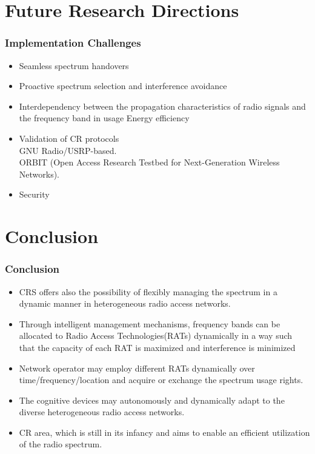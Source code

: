 \documentclass{beamer}
\begin{document}
\section{Future Research Directions}
\begin{frame}
\frametitle{Implementation Challenges}
\begin{itemize}
\item Seamless spectrum handovers
\item Proactive spectrum selection and interference avoidance
\item Interdependency between the propagation characteristics of radio signals and the frequency band in usage Energy efficiency
\item Validation of CR protocols\\
GNU Radio/USRP-based.\\
ORBIT (Open Access Research Testbed for Next-Generation Wireless Networks).
\item Security 

\end{itemize}
\end{frame}

\section{Conclusion}
\begin{frame}
\frametitle{Conclusion}
\begin{itemize}
\item CRS offers also the possibility of flexibly managing the spectrum in a dynamic manner in heterogeneous radio access networks. 
\item Through intelligent management mechanisms, frequency bands can be allocated to Radio Access Technologies(RATs) dynamically in a way such that the capacity of each RAT is maximized and interference is minimized
\item Network operator may employ different RATs dynamically over time/frequency/location and acquire or exchange the spectrum usage rights. 
\item The cognitive devices may autonomously and dynamically adapt to the diverse heterogeneous radio access networks.
\item CR area, which is still in its infancy and aims to enable an efficient utilization of the radio spectrum.

\end{itemize}
\end{frame}
\end{document}
